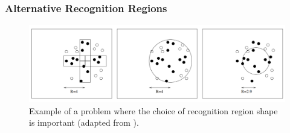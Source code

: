 \subsubsection{Alternative Recognition Regions}


\begin{figure}
    \centering
    \includegraphics[width=1.0\columnwidth]{figs/reczones.png}
    \caption[Alternative recognition region example]
    {Example of a problem where the choice of recognition region shape is important (adapted from \cite{AIS:NotAllBallsAreRound}).}
    \label{fig:recognition-region}
\end{figure}

